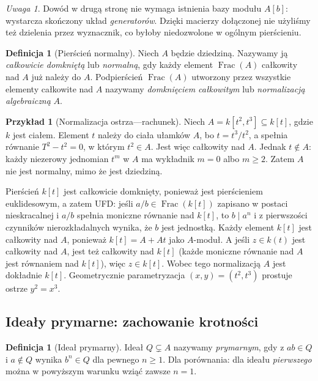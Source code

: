 \documentclass[11pt,a4paper,openany]{report}
\numberwithin{equation}{section}
\theoremstyle{plain}
\theoremstyle{definition}
\newtheorem{definicja}[twierdzenie]{Definicja}
\newtheorem{przyklad}[twierdzenie]{Przykład}
\theoremstyle{remark}
\newtheorem{uwaga}[twierdzenie]{Uwaga}
\newcommand{\Frac}{\operatorname{Frac}}
\begin{document}
\begin{uwaga}
Dowód w drugą stronę nie wymaga istnienia bazy modułu
$A[b]$: wystarcza skończony układ \emph{generatorów}.
Dzięki macierzy dołączonej nie użyliśmy też dzielenia
przez wyznacznik, co byłoby niedozwolone w ogólnym
pierścieniu.
\end{uwaga}

\begin{definicja}[Pierścień normalny]
Niech $A$ będzie dziedziną. Nazywamy ją
\emph{całkowicie domkniętą} lub \emph{normalną},
gdy każdy element $\Frac(A)$ całkowity nad $A$
już należy do $A$. Podpierścień $\Frac(A)$
utworzony przez wszystkie elementy całkowite nad $A$
nazywamy \emph{domknięciem całkowitym} lub
\emph{normalizacją algebraiczną} $A$.
\end{definicja}

\begin{przyklad}[Normalizacja ostrza---rachunek]
\label{prz:normalizacja-ostrza}
Niech $A=k[t^2,t^3]\subseteq k[t]$, gdzie $k$ jest ciałem.
Element $t$ należy do ciała ułamków $A$, bo
$t=t^3/t^2$, a spełnia równanie $T^2-t^2=0$,
w którym $t^2\in A$. Jest więc całkowity nad $A$.
Jednak $t\notin A$: każdy niezerowy jednomian $t^m$
w $A$ ma wykładnik $m=0$ albo $m\ge2$.
Zatem $A$ nie jest normalny, mimo że jest dziedziną.

Pierścień $k[t]$ jest całkowicie domknięty, ponieważ
jest pierścieniem euklidesowym, a zatem UFD: jeśli
$a/b\in\Frac(k[t])$ zapisano w postaci nieskracalnej
i $a/b$ spełnia moniczne równanie nad $k[t]$, to
$b\mid a^n$ i z pierwszości czynników nierozkładalnych
wynika, że $b$ jest jednostką. Każdy element $k[t]$
jest całkowity nad $A$, ponieważ
$k[t]=A+At$ jako $A$-moduł. A jeśli $z\in k(t)$
jest całkowity nad $A$, jest też całkowity nad $k[t]$
(każde moniczne równanie nad $A$ jest równaniem nad
$k[t]$), więc $z\in k[t]$. Wobec tego normalizacją
$A$ jest dokładnie $k[t]$.
Geometrycznie parametryzacja $(x,y)=(t^2,t^3)$
prostuje ostrze $y^2=x^3$.
\end{przyklad}

\subsection{Ideały prymarne: zachowanie krotności}
\begin{definicja}[Ideał prymarny]
Ideał $Q\subsetneq A$ nazywamy \emph{prymarnym},
gdy z $ab\in Q$ i $a\notin Q$ wynika
$b^n\in Q$ dla pewnego $n\ge1$.
Dla porównania: dla ideału \emph{pierwszego} można
w powyższym warunku wziąć zawsze $n=1$.
\end{definicja}
\end{document}
